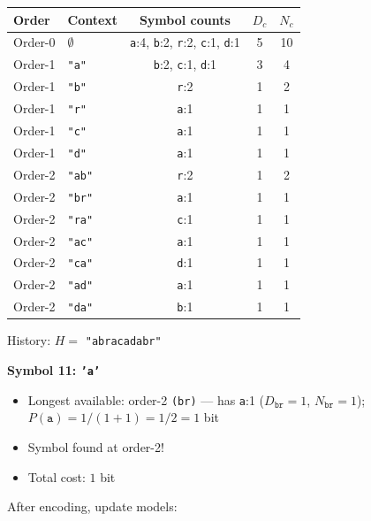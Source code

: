 \begin{examplebox}
\begin{center}
\footnotesize
\begin{tabular}{|l|l|c|c|c|}
\hline
\textbf{Order} & \textbf{Context} & \textbf{Symbol counts} & $D_c$ & $N_c$ \\
\hline
Order-0 & $\emptyset$ & \texttt{a}:4, \texttt{b}:2, \texttt{r}:2, \texttt{c}:1, \texttt{d}:1 & 5 & 10 \\
Order-1 & \texttt{"a"} & \texttt{b}:2, \texttt{c}:1, \texttt{d}:1 & 3 & 4 \\
Order-1 & \texttt{"b"} & \texttt{r}:2 & 1 & 2 \\
Order-1 & \texttt{"r"} & \texttt{a}:1 & 1 & 1 \\
Order-1 & \texttt{"c"} & \texttt{a}:1 & 1 & 1 \\
Order-1 & \texttt{"d"} & \texttt{a}:1 & 1 & 1 \\
Order-2 & \texttt{"ab"} & \texttt{r}:2 & 1 & 2 \\
Order-2 & \texttt{"br"} & \texttt{a}:1 & 1 & 1 \\
Order-2 & \texttt{"ra"} & \texttt{c}:1 & 1 & 1 \\
Order-2 & \texttt{"ac"} & \texttt{a}:1 & 1 & 1 \\
Order-2 & \texttt{"ca"} & \texttt{d}:1 & 1 & 1 \\
Order-2 & \texttt{"ad"} & \texttt{a}:1 & 1 & 1 \\
Order-2 & \texttt{"da"} & \texttt{b}:1 & 1 & 1 \\
\hline
\end{tabular}
\end{center}
History: $H =$ \texttt{"abracadabr"}

\bigskip
\textbf{Symbol 11: \texttt{'a'}}
\begin{itemize}
    \item Longest available: order-2 \texttt{(br)} — has \texttt{a}:1 ($D_{\texttt{br}}=1$, $N_{\texttt{br}}=1$); $P(\texttt{a}) = 1/(1+1) = 1/2 = 1$ bit
    \item Symbol found at order-2!
    \item Total cost: $1$ bit
\end{itemize}
After encoding, update models:


\end{examplebox}
